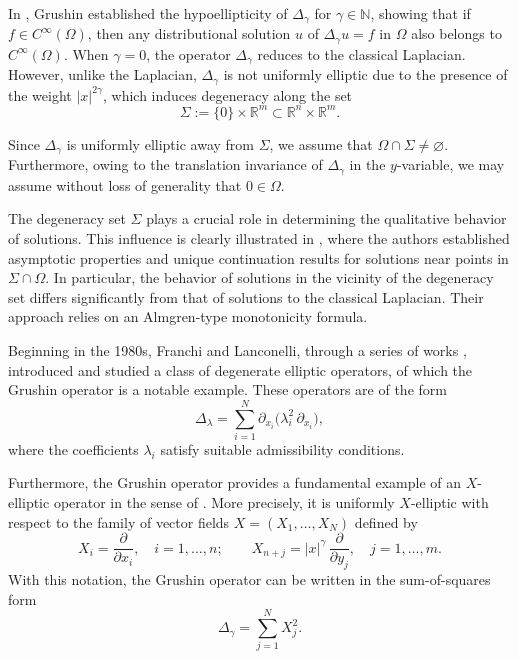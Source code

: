 \documentclass[11pt]{article}
\newcommand{\real}{\mathbb{R}}
\newcommand{\Gr}{\Delta_{\gamma}}
\begin{document}
In \cite{grushin_origin}, Grushin established the hypoellipticity of $\Delta_{\gamma}$ for $\gamma \in \mathbb{N}$, showing that if $f \in C^{\infty}(\Omega)$, then any distributional solution $u$ of $\Gr u = f$ in $\Omega$ also belongs to $C^{\infty}(\Omega)$. When $\gamma = 0$, the operator $\Gr$ reduces to the classical Laplacian. However, unlike the Laplacian, $\Gr$ is not uniformly elliptic due to the presence of the weight $|x|^{2\gamma}$, which induces degeneracy along the set
\begin{equation*}
\Sigma := \{0\} \times \real^m \subset \real^n \times \real^m.
\end{equation*}

Since $\Gr$ is uniformly elliptic away from $\Sigma$, we assume that $\Omega \cap \Sigma \neq \varnothing$. Furthermore, owing to the translation invariance of $\Gr$ in the $y$-variable, we may assume without loss of generality that $0 \in \Omega$.

The degeneracy set $\Sigma$ plays a crucial role in determining the qualitative behavior of solutions. This influence is clearly illustrated in \cite{ferrero_paolo_asymptotics}, where the authors established asymptotic properties and unique continuation results for solutions near points in $\Sigma \cap \Omega$. In particular, the behavior of solutions in the vicinity of the degeneracy set differs significantly from that of solutions to the classical Laplacian. Their approach relies on an Almgren-type monotonicity formula.

Beginning in the 1980s, Franchi and Lanconelli, through a series of works \cite{franchi_lanconelli_origin_lambda_operators,franchi_lanconelli_lambda_op_holder_cty,franchi_lanconelli_lambda_op_harnack}, introduced and studied a class of degenerate elliptic operators, of which the Grushin operator is a notable example. These operators are of the form
\begin{equation*}
\Delta_{\lambda}
=
\sum_{i=1}^{N}
\partial_{x_i}
\bigl(
\lambda_i^2 \, \partial_{x_i}
\bigr),
\end{equation*}
where the coefficients $\lambda_i$ satisfy suitable admissibility conditions.

Furthermore, the Grushin operator provides a fundamental example of an $X$-elliptic operator in the sense of \cite{lanconelli_kogoj_x_elliptic_harnack}. More precisely, it is uniformly $X$-elliptic with respect to the family of vector fields $X = (X_1, \dots, X_N)$ defined by
\begin{equation*} 
X_i = \frac{\partial}{\partial x_i}, \quad i = 1, \dots, n; 
\qquad
X_{n+j} = |x|^{\gamma}\,\frac{\partial}{\partial y_j}, \quad j = 1, \dots, m.
\end{equation*}
With this notation, the Grushin operator can be written in the sum-of-squares form
\begin{equation*}
\Delta_{\gamma} = \sum_{j=1}^{N} X_j^2.
\end{equation*}
\end{document}
